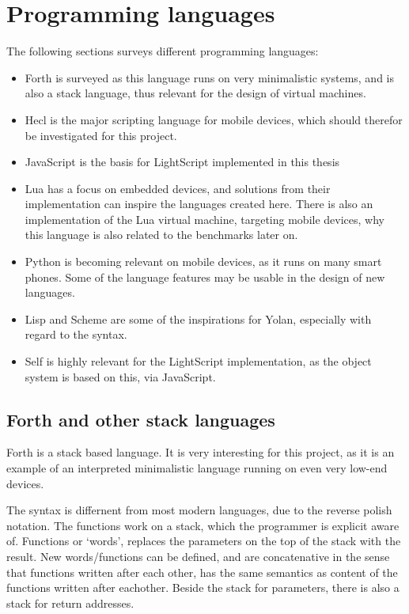 \documentclass[11pt]{report}
\begin{document}
\section{Programming languages}
The following sections surveys different programming languages:
\begin{itemize}
\item Forth is surveyed as this language runs on very minimalistic systems, and is also a stack language, thus relevant for the design of virtual machines. 
\item Hecl is the major scripting language for mobile devices, which should therefor be investigated for this project.
\item JavaScript is the basis for LightScript implemented in this thesis
\item Lua has a focus on embedded devices, and solutions from their implementation can inspire the languages created here. There is also an implementation of the Lua virtual machine, targeting mobile devices, why this language is also related to the benchmarks later on.
\item Python is becoming relevant on mobile devices, as it runs on many smart phones. Some of the language features may be usable in the design of new languages.
\item Lisp and Scheme are some of the inspirations for Yolan, especially with regard to the syntax.
\item Self is highly relevant for the LightScript implementation, as the object system is based on this, via JavaScript.
\end{itemize}


\subsection{Forth and other stack languages}
Forth is a stack based language.
It is very interesting for this project, as it is an example of an interpreted minimalistic language running on even very low-end devices.

The syntax is differnent from most modern languages, due to the reverse polish notation.
The functions work on a stack, which the programmer is explicit aware of. 
Functions or `words', replaces the parameters on the top of the stack with the result. 
New words/functions can be defined, and are concatenative in the sense that functions written after each other, has the same semantics as content of the functions written after eachother.
Beside the stack for parameters, there is also a stack for return addresses.
\end{document}
